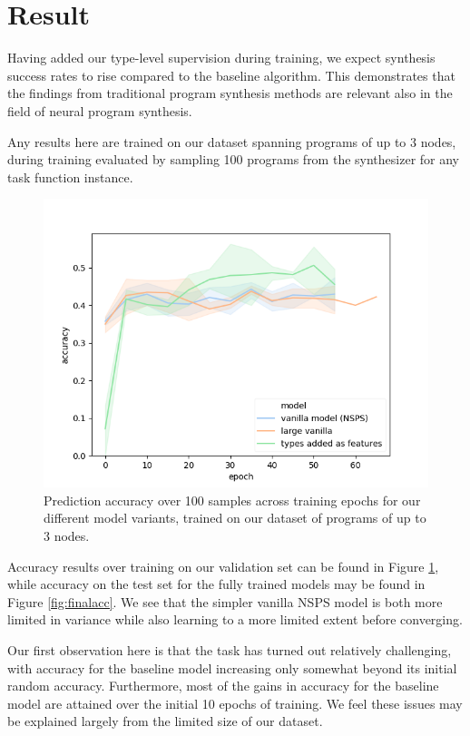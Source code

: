 \documentclass{article} %
\begin{document}

\section{Result} \label{sec:result}

Having added our type-level supervision during training, we expect synthesis success rates to rise
compared to the baseline algorithm.
This demonstrates that the findings from traditional program synthesis methods are relevant also in the field of neural program synthesis.

Any results here are trained on our dataset spanning programs of up to 3 nodes,
during training evaluated by sampling 100 programs from the synthesizer for any task function instance.

\begin{figure}[h]
    \includegraphics[scale=0.7]{figures/experiments.png}
    \caption{
        Prediction accuracy over 100 samples across training epochs for our different model variants,
        trained on our dataset of programs of up to 3 nodes.
    }
    \label{fig:accuracy}
\end{figure}

Accuracy results over training on our validation set can be found in Figure \ref{fig:accuracy},
while accuracy on the test set for the fully trained models may be found in Figure \ref{fig:finalacc}.
We see that the simpler vanilla NSPS model is both more limited in variance while also learning to a more limited extent before converging.

Our first observation here is that the task has turned out relatively challenging,
with accuracy for the baseline model increasing only somewhat beyond its initial random accuracy.
Furthermore, most of the gains in accuracy for the baseline model are attained over the initial 10 epochs of training.
We feel these issues may be explained largely from the limited size of our dataset.
\end{document}
